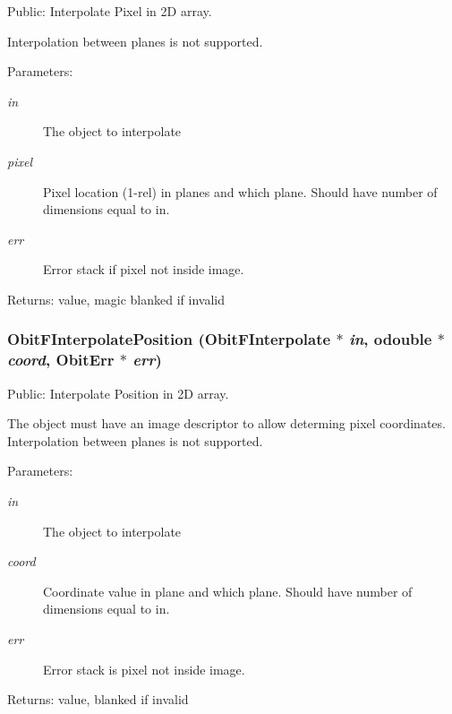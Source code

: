 Public: Interpolate Pixel in 2D array. 

Interpolation between planes is not supported. \begin{Desc}
\item[Parameters:]
\begin{description}
\item[{\em in}]The object to interpolate \item[{\em pixel}]Pixel location (1-rel) in planes and which plane. Should have number of dimensions equal to in. \item[{\em err}]Error stack if pixel not inside image. \end{description}
\end{Desc}
\begin{Desc}
\item[Returns:]value, magic blanked if invalid \end{Desc}
\subsubsection{ Obit\-FInterpolate\-Position ({\bf Obit\-FInterpolate} $\ast$ {\em in}, {\bf odouble} $\ast$ {\em coord}, {\bf Obit\-Err} $\ast$ {\em err})}\label{ObitFInterpolate_8c_a15}


Public: Interpolate Position in 2D array. 

The object must have an image descriptor to allow determing pixel coordinates. Interpolation between planes is not supported. \begin{Desc}
\item[Parameters:]
\begin{description}
\item[{\em in}]The object to interpolate \item[{\em coord}]Coordinate value in plane and which plane. Should have number of dimensions equal to in. \item[{\em err}]Error stack is pixel not inside image. \end{description}
\end{Desc}
\begin{Desc}
\item[Returns:]value, blanked if invalid \end{Desc}
